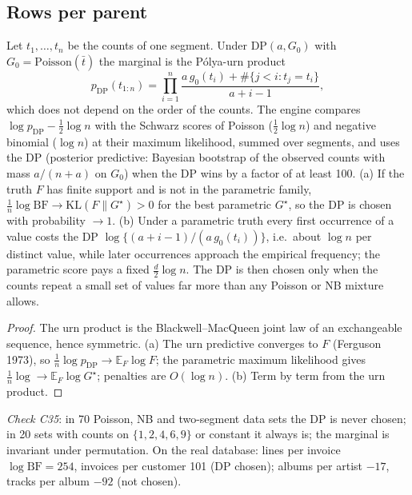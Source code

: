 \subsection{Rows per parent}
\begin{proposition}\label{prop:countbf}
Let $t_1,\dots,t_n$ be the counts of one segment. Under $\mathrm{DP}(a,G_0)$ with $G_0=\mathrm{Poisson}(\bar t)$ the marginal is the P\'olya-urn product
\[ p_{\mathrm{DP}}(t_{1:n})=\prod_{i=1}^n\frac{a\,g_0(t_i)+\#\{j<i:t_j=t_i\}}{a+i-1}, \]
which does not depend on the order of the counts. The engine compares $\log p_{\mathrm{DP}}-\tfrac12\log n$ with the Schwarz scores of Poisson ($\tfrac12\log n$) and negative binomial ($\log n$) at their maximum likelihood, summed over segments, and uses the DP (posterior predictive: Bayesian bootstrap of the observed counts with mass $a/(n+a)$ on $G_0$) when the DP wins by a factor of at least 100. (a) If the truth $F$ has finite support and is not in the parametric family, $\tfrac1n\log\mathrm{BF}\to\mathrm{KL}(F\|G^\star)>0$ for the best parametric $G^\star$, so the DP is chosen with probability $\to1$. (b) Under a parametric truth every first occurrence of a value costs the DP $\log\{(a+i-1)/(a\,g_0(t_i))\}$, i.e.\ about $\log n$ per distinct value, while later occurrences approach the empirical frequency; the parametric score pays a fixed $\tfrac d2\log n$. The DP is then chosen only when the counts repeat a small set of values far more than any Poisson or NB mixture allows.
\end{proposition}
\begin{proof}
The urn product is the Blackwell--MacQueen joint law of an exchangeable sequence, hence symmetric. (a) The urn predictive converges to $F$ (Ferguson 1973), so $\tfrac1n\log p_{\mathrm{DP}}\to\mathbb E_F\log F$; the parametric maximum likelihood gives $\tfrac1n\log\to\mathbb E_F\log G^\star$; penalties are $O(\log n)$. (b) Term by term from the urn product.
\end{proof}
\noindent\emph{Check C35}: in 70 Poisson, NB and two-segment data sets the DP is never chosen; in 20 sets with counts on $\{1,2,4,6,9\}$ or constant it always is; the marginal is invariant under permutation. On the real database: lines per invoice $\log\mathrm{BF}=254$, invoices per customer 101 (DP chosen); albums per artist $-17$, tracks per album $-92$ (not chosen).


